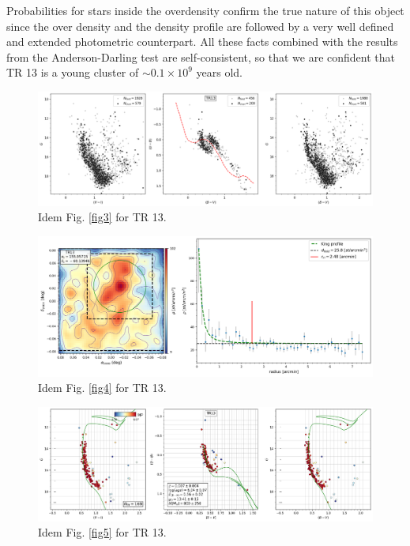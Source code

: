 \documentclass[draft]{aa}
\begin{document}
Probabilities for stars inside the overdensity confirm the true nature of this
object since the over density and the density profile are followed by a very
well defined and extended photometric counterpart. All these facts combined
with the results from the Anderson-Darling test are self-consistent, so that we
are confident that TR 13 is a young cluster of $\sim0.1\times10^9$ years old.

\begin{figure}[ht]
    \centering
    \includegraphics[width=\hsize]{../figs/obs_TR13.png}
    \caption{Idem Fig. \ref{fig3} for TR 13.}
    \label{fig39}
\end{figure}
\begin{figure}[ht]
    \centering
    \includegraphics[width=\hsize]{../figs/dmap_trumpler13.png}
    \caption{Idem Fig. \ref{fig4} for TR 13.}
    \label{fig40}
\end{figure}
\begin{figure}[ht]
    \centering
    \includegraphics[width=\hsize]{../figs/cmds_tr13.png}
    \caption{Idem Fig. \ref{fig5} for TR 13.}
    \label{fig41}
\end{figure}
\end{document}
